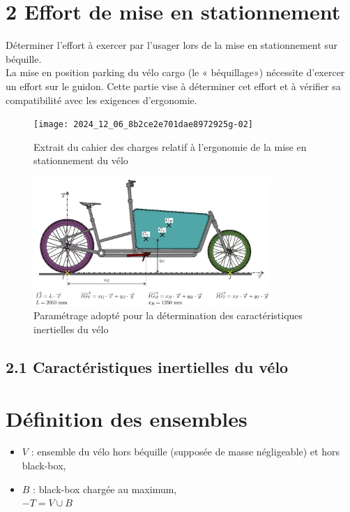 \section*{2 Effort de mise en stationnement}



Déterminer l'effort à exercer par l'usager lors de la mise en stationnement sur béquille.\\
La mise en position parking du vélo cargo (le « béquillage») nécessite d'exercer un effort sur le guidon. Cette partie vise à déterminer cet effort et à vérifier sa compatibilité avec les exigences d'ergonomie.\\

\begin{figure}[!htb]
\begin{center}
\texttt{[image: 2024\_12\_06\_8b2ce2e701dae8972925g-02]}
\caption{Extrait du cahier des charges relatif à l'ergonomie de la mise en stationnement du vélo\\ \label{fig2.1}}
\end{center}
\end{figure}

\begin{figure}[!htb]
\begin{center}
\includegraphics[width=0.8\textwidth]{images/2024_12_06_8b2ce2e701dae8972925g-02(1)}
\caption{Paramétrage adopté pour la détermination des caractéristiques inertielles du vélo \label{fig2.2}}
\end{center}
\end{figure}

\subsection*{2.1 Caractéristiques inertielles du vélo}
\section*{Définition des ensembles}
\begin{itemize}
  \item \(V\) : ensemble du vélo hors béquille (supposée de masse négligeable) et hors black-box,
  \item \(B\) : black-box chargée au maximum,\\
\(-T=V \cup B\)
\end{itemize}

